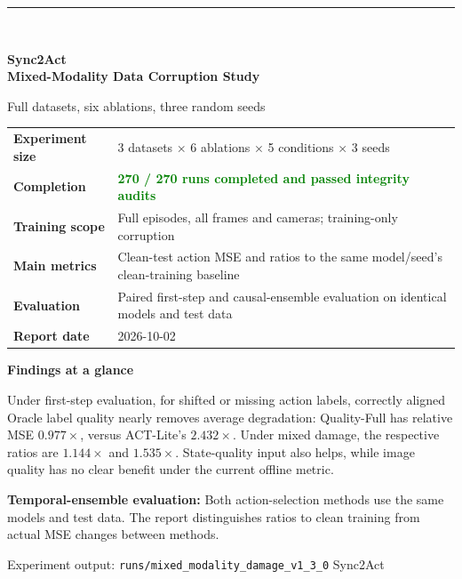 \documentclass[11pt,a4paper]{article}
\newcommand{\code}[1]{\texttt{\small #1}}
\newcommand{\good}[1]{\textcolor{green}{\bfseries #1}}
\begin{document}
\begin{titlepage}
\pagecolor{panel}
\vspace*{5mm}
{\color{blue}\rule{25mm}{2.5pt}}\\[7mm]
{\fontsize{22}{28}\selectfont\bfseries\color{navy} Sync2Act\\[2mm]
Mixed-Modality Data Corruption Study\par}
\vspace{5mm}
{\Large\color{muted}Full datasets, six ablations, three random seeds\par}
\vspace{8mm}

\begin{tcolorbox}[colback=white,colframe=rule,boxrule=0.7pt,arc=2mm,left=5mm,right=5mm,top=4mm,bottom=4mm]
\begin{tabularx}{\linewidth}{>{\raggedright\arraybackslash\bfseries\leavevmode\color{navy}}p{33mm}Y}
Experiment size & 3 datasets $\times$ 6 ablations $\times$ 5 conditions $\times$ 3 seeds\\
Completion & \good{270 / 270 runs completed and passed integrity audits}\\
Training scope & Full episodes, all frames and cameras; training-only corruption\\
Main metrics & Clean-test action MSE and ratios to the same model/seed's clean-training baseline\\
Evaluation & Paired first-step and causal-ensemble evaluation on identical models and test data\\
Report date & 2026-10-02
\end{tabularx}
\end{tcolorbox}

\vfill
{\large\color{ink}\bfseries Findings at a glance}\par
\vspace{2mm}
{\color{ink}Under first-step evaluation, for shifted or missing action labels, correctly aligned Oracle label quality nearly removes average degradation: Quality-Full has relative MSE $0.977\times$, versus ACT-Lite's $2.432\times$. Under mixed damage, the respective ratios are $1.144\times$ and $1.535\times$. State-quality input also helps, while image quality has no clear benefit under the current offline metric.\par}
\vspace{2mm}
{\small\color{ink}\textbf{Temporal-ensemble evaluation: }Both action-selection methods use the same models and test data. The report distinguishes ratios to clean training from actual MSE changes between methods.\par}
\vspace{6mm}
{\small\color{muted}Experiment output: \code{runs/mixed\_modality\_damage\_v1\_3\_0} \hfill Sync2Act}
\end{titlepage}
\nopagecolor
\end{document}
